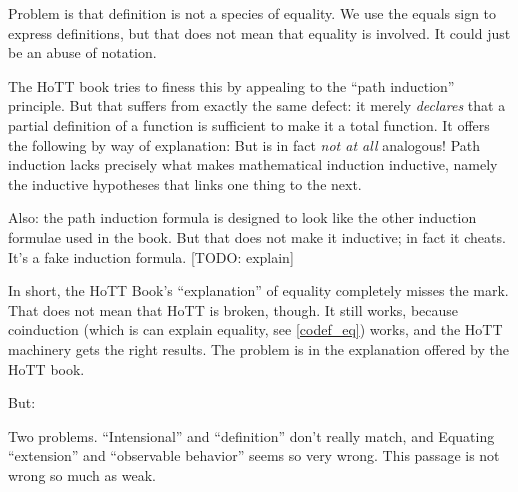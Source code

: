 \documentclass{article}
\begin{document}
Problem is that definition is not a species of equality. We use the
equals sign to express definitions, but that does not mean that
equality is involved. It could just be an abuse of notation.

The HoTT book tries to finess this by appealing to the ``path
induction'' principle. But that suffers from exactly the same defect:
it merely \textit{declares} that a partial definition of a function is
sufficient to make it a total function. It offers the following by way
of explanation:  But is in fact \textit{not at all} analogous!
Path induction lacks precisely what makes mathematical induction
inductive, namely the inductive hypotheses that links one thing to the
next.

Also: the path induction formula is designed to look like the other
induction formulae used in the book. But that does not make it
inductive; in fact it cheats. It's a fake induction formula. [TODO:
  explain]

In short, the HoTT Book's ``explanation'' of equality completely
misses the mark. That does not mean that HoTT is broken, though. It
still works, because coinduction (which is can explain equality, see
\ref{codef_eq}) works, and the HoTT machinery gets the right results.
The problem is in the explanation offered by the HoTT book.

But:


Two problems. ``Intensional'' and ``definition'' don't really match,
and Equating ``extension'' and ``observable behavior'' seems so very
wrong.  This passage is not wrong so much as weak.

\end{document}
